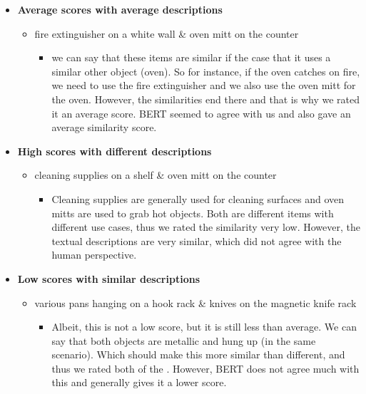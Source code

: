 \documentclass[]{article}
\begin{document}
\begin{itemize}
\begin{itemize}
    \end{itemize}
    \item
    \textbf{Average scores with average descriptions}
    \begin{itemize}
        \item fire extinguisher on a white wall \& oven mitt on the counter
        \begin{itemize}
            \item we can say that these items are similar if the case that it uses a similar other object (oven). So for instance, if the oven catches on fire, we need to use the fire extinguisher and we also use the oven mitt for the oven. However, the similarities end there and that is why we rated it an average score. BERT seemed to agree with us and also gave an average similarity score.
        \end{itemize}
    \end{itemize}
    
    \item 
    \textbf{High scores with different descriptions}
    \begin{itemize}
        \item cleaning supplies on a shelf \& oven mitt on the counter
        \begin{itemize}
            \item Cleaning supplies are generally used for cleaning surfaces and oven mitts are used to grab hot objects. Both are different items with different use cases, thus we rated the similarity very low. However, the textual descriptions are very similar, which did not agree with the human perspective.
        \end{itemize}
    \end{itemize}
    \item \textbf{Low scores with similar descriptions}
    \begin{itemize}
        \item various pans hanging on a hook rack \& knives on the magnetic knife rack
        \begin{itemize}
            \item Albeit, this is not a low score, but it is still less than average. We can say that both objects are metallic and hung up (in the same scenario). Which should make this more similar than different, and thus we rated both of the . However, BERT does not agree much with this and generally gives it a lower score. 
        \end{itemize}
    \end{itemize}
\end{itemize}
\clearpage
\end{document}
